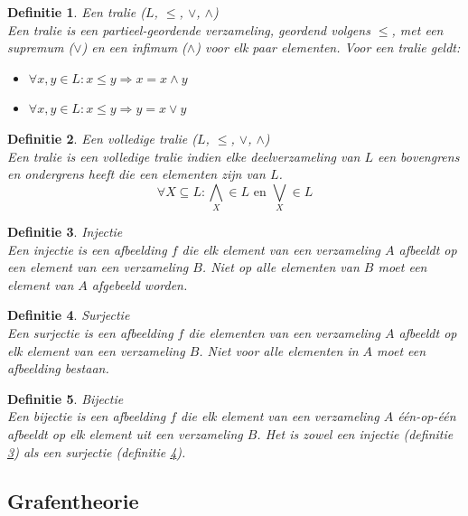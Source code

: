 \documentclass[a4paper]{article}
\newtheorem{tdefinitie}{Definitie}[section]
\newenvironment{definitie}[1]%
  {\begin{mdframed}[backgroundcolor=silver,
    topline=false,
    rightline=false,
    leftline=false,
    bottomline=false]\begin{tdefinitie}#1\\\normalfont}%
  {\end{tdefinitie}\end{mdframed}}
\newcommand{\en}{\ensuremath{\text{ en }}}
\begin{document}
\begin{definitie}{Een tralie ($L$, $\leq$, $\vee$, $\wedge$)}
  Een tralie is een partieel-geordende verzameling, geordend volgens $\leq$, met een supremum ($\vee$) en een infimum ($\wedge$) voor elk paar elementen. Voor een tralie geldt:
  \begin{itemize}
  \item $\forall x, y \in L: x \leq y \Rightarrow x = x \wedge y$
  \item $\forall x, y \in L: x \leq y \Rightarrow y = x \vee y$
  \end{itemize}
\end{definitie}

\begin{definitie}{Een volledige tralie ($L$, $\leq$, $\vee$, $\wedge$)}
  Een tralie is een volledige tralie indien elke deelverzameling van $L$ een bovengrens en ondergrens heeft die een elementen zijn van $L$.
  \begin{equation*}
  \forall X \subseteq L: \bigwedge_X \in L \en \bigvee_X \in L
  \end{equation*}
\end{definitie}

\begin{definitie}{Injectie}
  \label{def:inj}
  Een injectie is een afbeelding $f$ die elk element van een verzameling $A$ afbeeldt op een element van een verzameling $B$. Niet op alle elementen van $B$ moet een element van $A$ afgebeeld worden.
\end{definitie}

\begin{definitie}{Surjectie}
  \label{def:surj}
  Een surjectie is een afbeelding $f$ die elementen van een verzameling $A$ afbeeldt op elk element van een verzameling $B$. Niet voor alle elementen in $A$ moet een afbeelding bestaan.
\end{definitie}

\begin{definitie}{Bijectie}
  Een bijectie is een afbeelding $f$ die elk element van een verzameling $A$ \'e\'en-op-\'e\'en afbeeldt op elk element uit een verzameling $B$. Het is zowel een injectie (definitie \ref{def:inj}) als een surjectie (definitie \ref{def:surj}).
\end{definitie}

\subsection{Grafentheorie}
\end{document}
